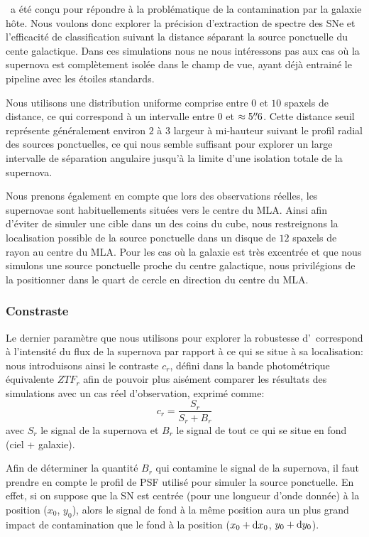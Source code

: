 \documentclass[../main/main.tex]{subfiles}
\begin{document}
\hypergal\ a été conçu pour répondre à la problématique de la
contamination par la galaxie hôte. Nous voulons donc explorer la
précision d'extraction de spectre des SNe et l'efficacité de
classification suivant la distance séparant la source ponctuelle du
cente galactique. Dans ces simulations nous ne nous intéressons pas aux
cas où la supernova est complètement isolée dans le champ de vue, ayant
déjà entrainé le pipeline avec les étoiles standards.

Nous utilisons une distribution uniforme comprise entre $0$ et $10$
spaxels de distance, ce qui correspond à un intervalle entre $0$ et
$\approx5\overset{\prime\prime}{.}6$. Cette distance seuil représente généralement environ $2$ à $3$ largeur à
mi-hauteur suivant le profil radial des sources ponctuelles, ce qui nous
semble suffisant pour explorer un large intervalle de séparation
angulaire jusqu'à la limite d'une isolation totale de la supernova.

Nous prenons également en compte que lors des observations réelles, les
supernovae sont habituellements situées vers le centre du MLA. Ainsi
afin d'éviter de simuler une cible dans un des coins du cube, nous
restreignons la localisation possible de la source ponctuelle dans un
disque de $12$ spaxels de rayon au centre du MLA. Pour les cas où la
galaxie est très excentrée et que nous simulons une source ponctuelle
proche du centre galactique, nous privilégions de la positionner dans le
quart de cercle en direction du centre du MLA. 

\subsubsection{Constraste}

Le dernier paramètre que nous utilisons pour explorer la robustesse
d'\hypergal\ correspond à l'intensité du flux de la supernova par
rapport à ce qui se situe à sa localisation: nous introduisons ainsi le
contraste $c_{r}$, défini dans la bande photométrique équivalente $ZTF_{r}$
afin de pouvoir plus aisément comparer les résultats des simulations
avec un cas réel d'observation, exprimé comme:
\begin{equation}
  \label{eq:contrast}
  c_{r} = \frac{S_{r}}{S_{r}+B_{r}}
\end{equation}
avec $S_{r}$ le signal de la supernova et $B_{r}$ le signal de tout ce qui se
situe en fond (ciel + galaxie).

Afin de déterminer la quantité $B_{r}$ qui contamine le signal de la
supernova, il faut prendre en compte le profil de PSF utilisé pour
simuler la source ponctuelle. En effet, si on suppose que la SN est
centrée (pour une longueur d'onde donnée) à la position ($x_{0}$,
$y_{0}$), alors le signal de fond à la même position aura un plus grand
impact de contamination que le fond à la position ($x_{0}+\mathrm{d} x_{0}$,
$y_{0}+\mathrm{d} y_{0}$).
\end{document}

